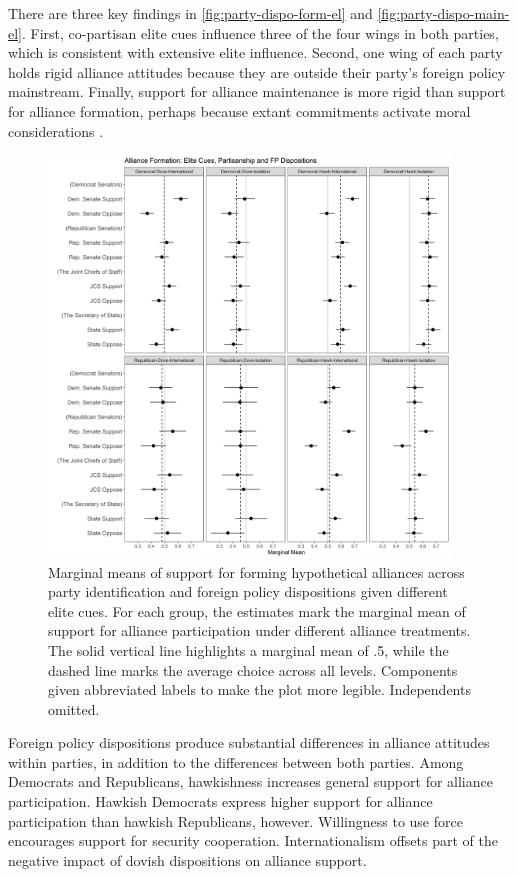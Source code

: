 \documentclass[12pt]{article}
\begin{document}
There are three key findings in \autoref{fig:party-dispo-form-el} and \autoref{fig:party-dispo-main-el}. 
First, co-partisan elite cues influence three of the four wings in both parties, which is consistent with extensive elite influence. 
Second, one wing of each party holds rigid alliance attitudes because they are outside their party's foreign policy mainstream.  
Finally, support for alliance maintenance is more rigid than support for alliance formation, perhaps because extant commitments activate moral considerations \citep{TomzWeeks2021}. 


\begin{figure}[htpb]
	\centering
		\includegraphics[width=0.95\textwidth]{../figures/party-dispo-form-el.png}
	\caption{Marginal means of support for forming hypothetical alliances across party identification and foreign policy dispositions given different elite cues. For each group, the estimates mark the marginal mean of support for alliance participation under different alliance treatments. The solid vertical line highlights a marginal mean of .5, while the dashed line marks the average choice across all levels. Components given abbreviated labels to make the plot more legible. Independents omitted.}
	\label{fig:party-dispo-form-el}
\end{figure}


Foreign policy dispositions produce substantial differences in alliance attitudes within parties, in addition to the differences between both parties. 
Among Democrats and Republicans, hawkishness increases general support for alliance participation.
Hawkish Democrats express higher support for alliance participation than hawkish Republicans, however. 
Willingness to use force encourages support for security cooperation. 
Internationalism offsets part of the negative impact of dovish dispositions on alliance support. 
\end{document}
